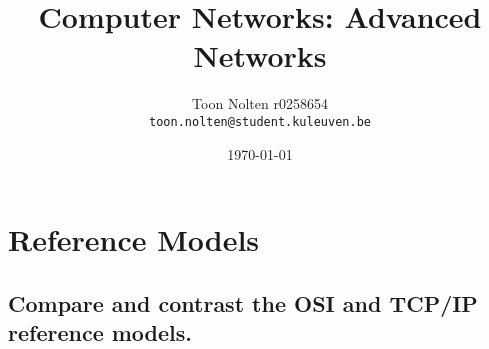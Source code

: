 \documentclass[11pt, a4paper, oneside, draft]{article}
\begin{document}
\title{Computer Networks: Advanced Networks}
\author{Toon Nolten r0258654\\
    \texttt{toon.nolten@student.kuleuven.be}
        }
\date{\today}
\maketitle

\section{Reference Models}
\subsection{Compare and contrast the OSI and TCP/IP reference models.}
\end{document}
